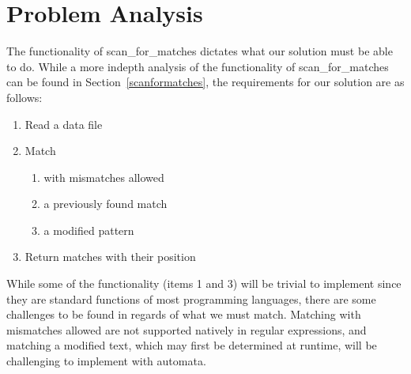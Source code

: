 \section{Problem Analysis}\label{probanal}
The functionality of scan\_for\_matches dictates what our solution must be able 
to do. While a more indepth analysis of the functionality 
of scan\_for\_matches can be found in Section~\ref{scanformatches}, 
the requirements for our solution are as follows:
\begin{enumerate}
\item Read a data file
\item Match
\begin{enumerate}
\item with mismatches allowed
\item a previously found match
\item a modified pattern
\end{enumerate}
\item Return matches with their position
\end{enumerate}
While some of the functionality (items 1 and 3) will be trivial to implement 
since they are standard functions of most programming languages, there are 
some challenges to be found in regards of what we must match. Matching with 
mismatches allowed are not supported natively in regular expressions, and 
matching a modified text, which may first be determined at runtime, will be 
challenging to implement with automata.
